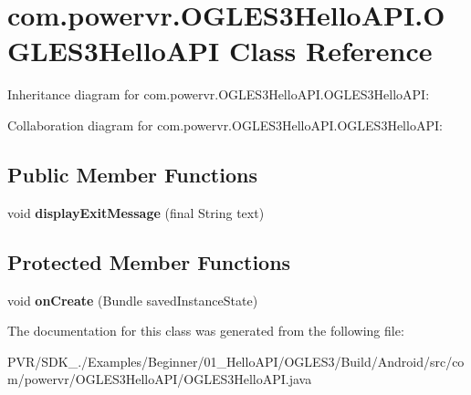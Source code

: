 \hypertarget{classcom_1_1powervr_1_1_o_g_l_e_s3_hello_a_p_i_1_1_o_g_l_e_s3_hello_a_p_i}{\section{com.\+powervr.\+O\+G\+L\+E\+S3\+Hello\+A\+P\+I.\+O\+G\+L\+E\+S3\+Hello\+A\+P\+I Class Reference}
\label{classcom_1_1powervr_1_1_o_g_l_e_s3_hello_a_p_i_1_1_o_g_l_e_s3_hello_a_p_i}
}


Inheritance diagram for com.\+powervr.\+O\+G\+L\+E\+S3\+Hello\+A\+P\+I.\+O\+G\+L\+E\+S3\+Hello\+A\+P\+I\+:


Collaboration diagram for com.\+powervr.\+O\+G\+L\+E\+S3\+Hello\+A\+P\+I.\+O\+G\+L\+E\+S3\+Hello\+A\+P\+I\+:
\subsection*{Public Member Functions}
\begin{DoxyCompactItemize}
\item 
\hypertarget{classcom_1_1powervr_1_1_o_g_l_e_s3_hello_a_p_i_1_1_o_g_l_e_s3_hello_a_p_i_a66ef962e9245f25971fed0e4e1d044ef}{void {\bfseries display\+Exit\+Message} (final String text)}\label{classcom_1_1powervr_1_1_o_g_l_e_s3_hello_a_p_i_1_1_o_g_l_e_s3_hello_a_p_i_a66ef962e9245f25971fed0e4e1d044ef}

\end{DoxyCompactItemize}
\subsection*{Protected Member Functions}
\begin{DoxyCompactItemize}
\item 
\hypertarget{classcom_1_1powervr_1_1_o_g_l_e_s3_hello_a_p_i_1_1_o_g_l_e_s3_hello_a_p_i_a8b4ce2853e01f2c8f2a659b625541c77}{void {\bfseries on\+Create} (Bundle saved\+Instance\+State)}\label{classcom_1_1powervr_1_1_o_g_l_e_s3_hello_a_p_i_1_1_o_g_l_e_s3_hello_a_p_i_a8b4ce2853e01f2c8f2a659b625541c77}

\end{DoxyCompactItemize}


The documentation for this class was generated from the following file\+:\begin{DoxyCompactItemize}
\item 
P\+V\+R/\+S\+D\+K\+\_./\+Examples/\+Beginner/01\+\_\+\+Hello\+A\+P\+I/\+O\+G\+L\+E\+S3/\+Build/\+Android/src/com/powervr/\+O\+G\+L\+E\+S3\+Hello\+A\+P\+I/O\+G\+L\+E\+S3\+Hello\+A\+P\+I.\+java\end{DoxyCompactItemize}
